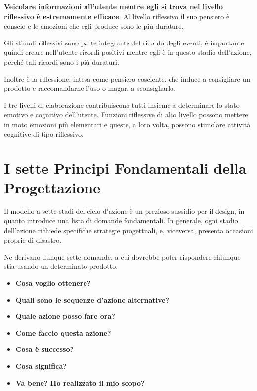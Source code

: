 \documentclass[a4paper,11pt,oneside]{book}
\begin{document}
\pagebreak

\textbf{Veicolare informazioni all'utente mentre egli si trova nel livello riflessivo è estremamente efficace}. Al livello riflessivo il suo pensiero è conscio e le emozioni che egli produce sono le più durature.

Gli stimoli riflessivi sono parte integrante del ricordo degli eventi, è importante quindi creare nell'utente ricordi positivi mentre egli è in questo stadio dell'azione, perché tali ricordi sono i più duraturi.

Inoltre è la riflessione, intesa come pensiero cosciente, che induce a consigliare un prodotto e raccomandarne l'uso o magari a sconsigliarlo.

I tre livelli di elaborazione contribuiscono tutti insieme a determinare lo stato emotivo e cognitivo dell'utente. Funzioni riflessive di alto livello possono mettere in moto emozioni più elementari e  queste, a loro volta, possono stimolare attività cognitive di tipo riflessivo.

\section{I sette Principi Fondamentali della Progettazione}
Il modello a sette stadi del ciclo d'azione è un prezioso sussidio per il design, in quanto introduce una lista di domande fondamentali. In generale, ogni stadio dell'azione richiede specifiche strategie progettuali, e, viceversa, presenta occasioni proprie di disastro.

Ne derivano dunque sette domande, a cui dovrebbe poter rispondere chiunque stia usando un determinato prodotto.

\begin{itemize}
	\item \textbf{Cosa voglio ottenere?}
	\item \textbf{Quali sono le sequenze d'azione alternative?}
	\item \textbf{Quale azione posso fare ora?}
	\item \textbf{Come faccio questa azione?}
	\item \textbf{Cosa è successo?}
	\item \textbf{Cosa significa?}
	\item \textbf{Va bene? Ho realizzato il mio scopo?}
\end{itemize}
\end{document}
